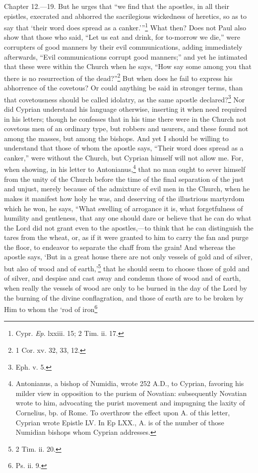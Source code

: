 
Chapter 12.—19. But he urges that ``we find that the apostles, in all their epistles, execrated and abhorred the sacrilegious wickedness of heretics, so as to say that ‘their word does spread as a canker.’''\footnote{\par  Cypr. \emph{Ep}. lxxiii. 15; 2 Tim. ii. 17.} What then? Does not Paul also show that those who said, ``Let us eat and drink, for to-morrow we die,'' were corrupters of good manners by their evil communications, adding immediately afterwards, ``Evil communications corrupt good manners;'' and yet he intimated that these were within the Church when he says, ``How say some among you that there is no resurrection of the dead?''\footnote{\par  1 Cor. xv. 32, 33, 12.} But when does he fail to express his abhorrence of the covetous? Or could anything be said in stronger terms, than that covetousness should be called idolatry, as the same apostle declared?\footnote{\par  Eph. v. 5.} Nor did Cyprian understand his language otherwise, inserting it when need required in his letters; though he confesses that in his time there were in the Church not covetous men of an ordinary type, but robbers and usurers, and these found not among the masses, but among the bishops. And yet I should be willing to understand that those of whom the apostle says, ``Their word does spread as a canker,'' were without the Church, but Cyprian himself will not allow me. For, when showing, in his letter to Antonianus,\footnote{\par  Antonianus, a bishop of Numidia, wrote 252 A.D., to Cyprian, favoring his milder view in opposition to the purism of Novatian: subsequently Novatian wrote to him, advocating the purist movement and impugning the laxity of Cornelius, bp. of Rome. To overthrow the effect upon A. of this letter, Cyprian wrote Epistle LV. In Ep LXX., A. is of the number of those Numidian bishops whom Cyprian addresses.} that no man ought to sever himself from the unity of the Church before the time of the final separation of the just and unjust, merely because of the admixture of evil men in the Church, when he makes it manifest how holy he was, and deserving of the illustrious martyrdom which he won, he says, ``What swelling of arrogance it is, what forgetfulness of humility and gentleness, that any one should dare or believe that he can do what the Lord did not grant even to the apostles,—to think that he can distinguish the tares from the wheat, or, as if it were granted to him to carry the fan and purge the floor, to endeavor to separate the chaff from the grain! And whereas the apostle says, ‘But in a great house there are not only vessels of gold and of silver, but also of wood and of earth,’\footnote{\par  2 Tim. ii. 20.} that he should seem to choose those of gold and of silver, and despise and cast away and condemn those of wood and of earth, when really the vessels of wood are only to be burned in the day of the Lord by the burning of the divine conflagration, and those of earth are to be broken by Him to whom the ‘rod of iron\footnote{\par  Ps. ii. 9.} 